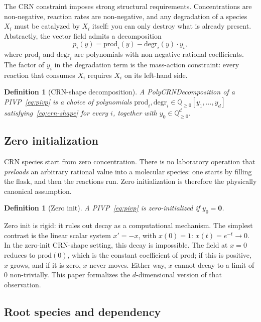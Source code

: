 \documentclass[11pt]{article}
\newtheorem{definition}[theorem]{Definition}
\newcommand{\Q}{\mathbb{Q}}
\newcommand{\prodpoly}{\mathrm{prod}}
\newcommand{\degrpoly}{\mathrm{degr}}
\begin{document}
The CRN constraint imposes strong structural requirements. Concentrations are
non-negative, reaction rates are non-negative, and any degradation of a
species $X_i$ must be catalyzed by $X_i$ itself: you can only destroy what is
already present. Abstractly, the vector field admits a decomposition
\begin{equation}\label{eq:crn-shape}
  p_i(y) = \prodpoly_i(y) - \degrpoly_i(y) \cdot y_i,
\end{equation}
where $\prodpoly_i$ and $\degrpoly_i$ are polynomials with non-negative
rational coefficients. The factor of $y_i$ in the degradation term is the
mass-action constraint: every reaction that consumes $X_i$ requires $X_i$ on
its left-hand side.

\begin{definition}[CRN-shape decomposition]\label{def:pcd}
A \emph{\mbox{PolyCRNDecomposition}} of a PIVP~\eqref{eq:pivp} is a choice of
polynomials $\prodpoly_i, \degrpoly_i \in \Q_{\ge 0}[y_1, \ldots, y_d]$
satisfying~\eqref{eq:crn-shape} for every $i$, together with
$y_0 \in \Q_{\ge 0}^d$.
\end{definition}

\subsection{Zero initialization}

CRN species start from zero concentration. There is no laboratory operation
that \emph{preloads} an arbitrary rational value into a molecular species: one
starts by filling the flask, and then the reactions run. Zero initialization
is therefore the physically canonical assumption.

\begin{definition}[Zero init]
A PIVP~\eqref{eq:pivp} is \emph{zero-initialized} if $y_0 = \mathbf{0}$.
\end{definition}

Zero init is rigid: it rules out decay as a computational mechanism. The
simplest contrast is the linear scalar system $x'=-x$, with $x(0) = 1$:
$x(t) = e^{-t} \to 0$. In the zero-init CRN-shape setting, this decay is
impossible. The field at $x = 0$ reduces to $\prodpoly(0)$, which is the
constant coefficient of $\prodpoly$; if this is positive, $x$ grows, and if it
is zero, $x$ never moves. Either way, $x$ cannot decay to a limit of $0$
non-trivially. This paper formalizes the $d$-dimensional version of that
observation.

\subsection{Root species and dependency}
\end{document}

